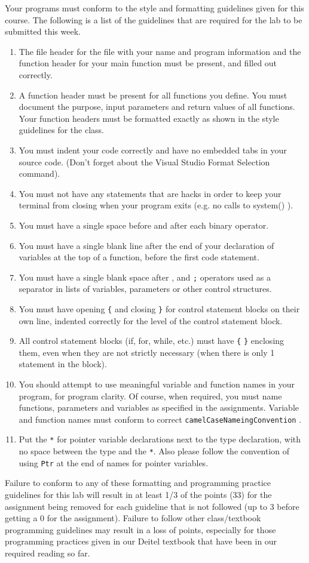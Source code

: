 \documentclass[11pt]{article}
\begin{document}
Your programs must conform to the style and formatting guidelines given for this course.
The following is a list of the guidelines that are required for the lab to be submitted
this week.

\begin{enumerate}
\item The file header for the file with your name and program information
  and the function header for your main function must be present, and
  filled out correctly.
\item A function header must be present for all functions you define.
   You must document the purpose, input parameters and return values
   of all functions.  Your function headers must be formatted exactly
   as shown in the style guidelines for the class.
\item You must indent your code correctly and have no embedded tabs in
  your source code. (Don't forget about the Visual Studio Format
  Selection command).
\item You must not have any statements that are hacks in order to keep
   your terminal from closing when your program exits (e.g. no calls
   to system() ).
\item You must have a single space before and after each binary operator.
\item You must have a single blank line after the end of your declaration
  of variables at the top of a function, before the first code
  statement.
\item You must have a single blank space after , and \verb~;~ operators used as a
  separator in lists of variables, parameters or other control
  structures.
\item You must have opening \verb~{~ and closing \verb~}~ for control statement blocks
  on their own line, indented correctly for the level of the control
  statement block.
\item All control statement blocks (if, for, while, etc.) must have \verb~{~
   \verb~}~ enclosing them, even when they are not strictly necessary
   (when there is only 1 statement in the block).
\item You should attempt to use meaningful variable and function names in
   your program, for program clarity.  Of course, when required, you
   must name functions, parameters and variables as specified in the
   assignments.  Variable and function names must conform to correct
   \verb~camelCaseNameingConvention~ .
\item Put the \verb~*~ for pointer variable declarations next to the
   type declaration, with no space between the type and the \verb~*~.
   Also please follow the convention of using \verb~Ptr~ at the end of
   names for pointer variables.
\end{enumerate}

Failure to conform to any of these formatting and programming practice
guidelines for this lab will result in at least 1/3 of the points (33)
for the assignment being removed for each guideline that is not
followed (up to 3 before getting a 0 for the assignment). Failure to
follow other class/textbook programming guidelines may result in a
loss of points, especially for those programming practices given in
our Deitel textbook that have been in our required reading so far.
\end{document}

